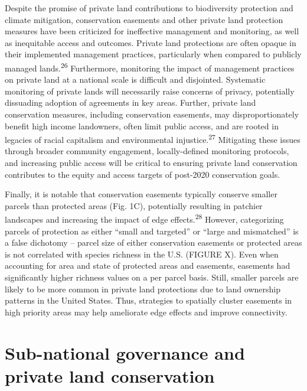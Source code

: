 \documentclass[3p]{elsarticle} %
\begin{document}
Despite the promise of private land contributions to biodiversity
protection and climate mitigation, conservation easements and other
private land protection measures have been criticized for ineffective
management and monitoring, as well as inequitable access and outcomes.
Private land protections are often opaque in their implemented
management practices, particularly when compared to publicly managed
lands.\textsuperscript{26} Furthermore, monitoring the impact of
management practices on private land at a national scale is difficult
and disjointed. Systematic monitoring of private lands will necessarily
raise concerns of privacy, potentially dissuading adoption of agreements
in key areas. Further, private land conservation measures, including
conservation easements, may disproportionately benefit high income
landowners, often limit public access, and are rooted in legacies of
racial capitalism and environmental injustice.\textsuperscript{27}
Mitigating these issues through broader community engagement,
locally-defined monitoring protocols, and increasing public access will
be critical to ensuring private land conservation contributes to the
equity and access targets of post-2020 conservation goals.

Finally, it is notable that conservation easements typically conserve
smaller parcels than protected areas (Fig. 1C), potentially resulting in
patchier landscapes and increasing the impact of edge
effects.\textsuperscript{28} However, categorizing parcels of protection
as either ``small and targeted'' or ``large and mismatched'' is a false
dichotomy -- parcel size of either conservation easements or protected
areas is not correlated with species richness in the U.S. (FIGURE X).
Even when accounting for area and state of protected areas and
easements, easements had significantly higher richness values on a per
parcel basis. Still, smaller parcels are likely to be more common in
private land protections due to land ownership patterns in the United
States. Thus, strategies to spatially cluster easements in high priority
areas may help ameliorate edge effects and improve connectivity.

\hypertarget{sub-national-governance-and-private-land-conservation}{%
\section{Sub-national governance and private land
conservation}\label{sub-national-governance-and-private-land-conservation}}
\end{document}
